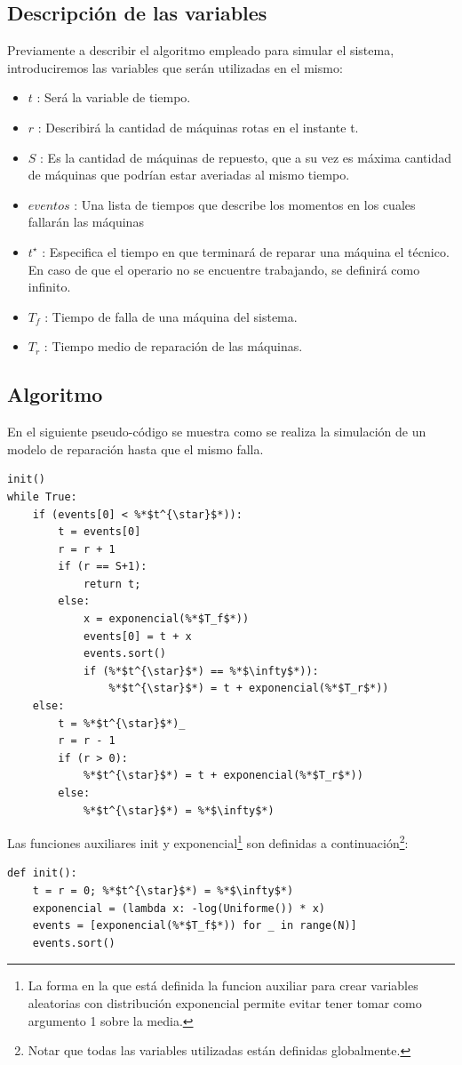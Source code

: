 \documentclass[10pt,a4paper]{article} %
\begin{document}
    \subsection{Descripci\'on de las variables}
    Previamente a describir el algoritmo empleado para simular el sistema, introduciremos las variables que ser\'an utilizadas en el mismo:
    \begin{itemize}
    \item $t$ : Ser\'a la variable de tiempo.
    \item $r$ : Describir\'a la cantidad de m\'aquinas rotas en el instante t.
    \item $S$ : Es la cantidad de m\'aquinas de repuesto, que a su vez es m\'axima cantidad de m\'aquinas que podr\'ian estar averiadas al mismo tiempo.
    \item $eventos$ : Una lista de tiempos que describe los momentos en los cuales fallar\'an las m\'aquinas
    \item $t^{\star}$ : Especifica el tiempo en que terminar\'a de reparar una m\'aquina el t\'ecnico. En caso de que el operario no se encuentre trabajando, se definir\'a como infinito.
    \item $T_f$ : Tiempo de falla de una m\'aquina del sistema.
    \item $T_r$ : Tiempo medio de reparaci\'on de las m\'aquinas.
    \end{itemize}

    \subsection{Algoritmo}
    En el siguiente pseudo-c\'odigo se muestra como se realiza la simulaci\'on de un modelo de reparaci\'on hasta que el mismo falla.
    
    \begin{lstlisting}[caption=Funciones auxiliares.]
init()
while True:
    if (events[0] < %*$t^{\star}$*)):
        t = events[0]
        r = r + 1
        if (r == S+1):
            return t;
        else:
            x = exponencial(%*$T_f$*))
            events[0] = t + x
            events.sort()
            if (%*$t^{\star}$*) == %*$\infty$*)):
                %*$t^{\star}$*) = t + exponencial(%*$T_r$*))
    else: 
        t = %*$t^{\star}$*)_
        r = r - 1
        if (r > 0):
            %*$t^{\star}$*) = t + exponencial(%*$T_r$*))
        else:
            %*$t^{\star}$*) = %*$\infty$*)
    \end{lstlisting}
Las funciones auxiliares init y exponencial\footnote{La forma en la que est\'a definida la funcion auxiliar para crear variables aleatorias con distribuci\'on exponencial permite evitar tener tomar como argumento 1 sobre la media.} son definidas a continuaci\'on\footnote{Notar que todas las variables utilizadas est\'an definidas globalmente.}:
    \begin{lstlisting}[caption=Pseudo-c\'odigo del las funciones auxiliares.]
def init():
    t = r = 0; %*$t^{\star}$*) = %*$\infty$*)
    exponencial = (lambda x: -log(Uniforme()) * x)
    events = [exponencial(%*$T_f$*)) for _ in range(N)]
    events.sort()
    \end{lstlisting}
    
\end{document}
